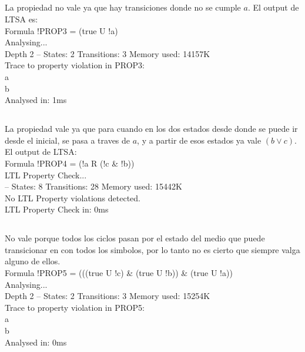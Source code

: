\subsection{}
La propiedad no vale ya que hay transiciones donde no se cumple $a$. El output de LTSA es: \\

Formula !PROP3 = (true U !a) \\
Analysing... \\
Depth 2 -- States: 2 Transitions: 3 Memory used: 14157K \\
Trace to property violation in PROP3: \\
  a \\
  b \\
Analysed in: 1ms \\

\subsection{}
La propiedad vale ya que para cuando en los dos estados desde donde se puede ir desde el inicial, se pasa a traves de $a$, y a partir de esos estados ya vale $(b \lor c)$. El output de LTSA: \\

Formula !PROP4 = (!a R (!c & !b)) \\
LTL Property Check... \\
-- States: 8 Transitions: 28 Memory used: 15442K \\
No LTL Property violations detected. \\
LTL Property Check in: 0ms \\

\subsection{}
No vale porque todos los ciclos pasan por el estado del medio que puede transicionar en con todos los simbolos, por lo tanto no es cierto que siempre valga alguno de ellos. \\

Formula !PROP5 = (((true U !c) & (true U !b)) & (true U !a)) \\
Analysing... \\
Depth 2 -- States: 2 Transitions: 3 Memory used: 15254K \\
Trace to property violation in PROP5: \\
  a \\
  b \\
Analysed in: 0ms \\

